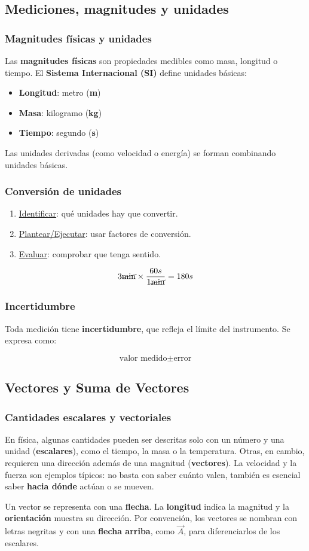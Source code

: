 \documentclass{article}
\newcommand{\newsubsection}[1]{
    \vspace{0.5cm}
    \color{sectionColor}
    \subsection{\bl{#1}}
    \color{black}
    \vspace{0.5cm}
}
\newcommand{\newtitle}[1]{
    \color{titleColor}
    \subsubsection{#1}
    \color{black}
}
\newcommand{\bl}[1]{\textbf{#1}}
\begin{document}

    \newsubsection{Mediciones, magnitudes y unidades}

    \newtitle{Magnitudes físicas y unidades}

    \par Las \bl{magnitudes físicas} son propiedades medibles como masa, longitud o tiempo. El \bl{Sistema Internacional (SI)} define unidades básicas:

    \begin{itemize}
        \item \bl{Longitud}: metro (\bl{m})
        \item \bl{Masa}: kilogramo (\bl{kg})
        \item \bl{Tiempo}: segundo (\bl{s})
    \end{itemize}

    \par Las unidades derivadas (como velocidad o energía) se forman combinando unidades básicas.

    \newtitle{Conversión de unidades}

    \begin{enumerate}
        \item \underline{Identificar}: qué unidades hay que convertir.
        \item \underline{Plantear/Ejecutar}: usar factores de conversión.
        \item \underline{Evaluar}: comprobar que tenga sentido.
    \end{enumerate}

    \[
        3\cancel{\text{min}} \times \frac{60s}{1\cancel{\text{min}}} = 180s
    \]

    \newtitle{Incertidumbre}

    \par Toda medición tiene \bl{incertidumbre}, que refleja el límite del instrumento. Se expresa como:

    \[
        \text{valor medido} \pm \text{error}
    \]

    \newsubsection{Vectores y Suma de Vectores}

    \newtitle{Cantidades escalares y vectoriales}

    \par En física, algunas cantidades pueden ser descritas solo con un número y una unidad (\bl{escalares}), como el tiempo, la masa o la temperatura. Otras, en cambio, requieren una dirección además de una magnitud (\bl{vectores}). La velocidad y la fuerza son ejemplos típicos: no basta con saber cuánto valen, también es esencial saber \bl{hacia dónde} actúan o se mueven.
    \par Un vector se representa con una \bl{flecha}. La \bl{longitud} indica la magnitud y la \bl{orientación} muestra su dirección. Por convención, los vectores se nombran con letras negritas y con una \bl{flecha arriba}, como \(\vec{A}\), para diferenciarlos de los escalares.
\end{document}
